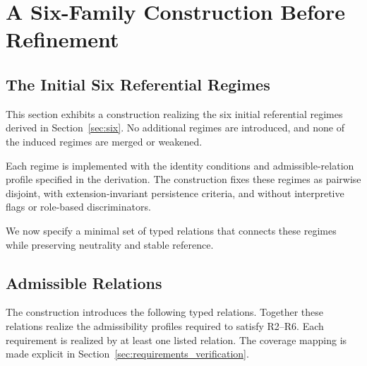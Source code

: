 
\section{A Six-Family Construction Before Refinement}
\label{sec:before_refinement}


\subsection{The Initial Six Referential Regimes}

This section exhibits a construction realizing
the six initial referential regimes
derived in Section~\ref{sec:six}.
No additional regimes are introduced,
and none of the induced regimes are merged or weakened.

Each regime is implemented with the identity conditions
and admissible-relation profile specified in the derivation.
The construction fixes these regimes as pairwise disjoint,
with extension-invariant persistence criteria,
and without interpretive flags or role-based discriminators.

We now specify a minimal set of typed relations
that connects these regimes while preserving
neutrality and stable reference.

\subsection{Admissible Relations}

The construction introduces the following typed relations.
Together these relations realize the admissibility profiles
required to satisfy R2--R6.
Each requirement is realized by at least one listed relation.
The coverage mapping is made explicit in
Section~\ref{sec:requirements_verification}.

